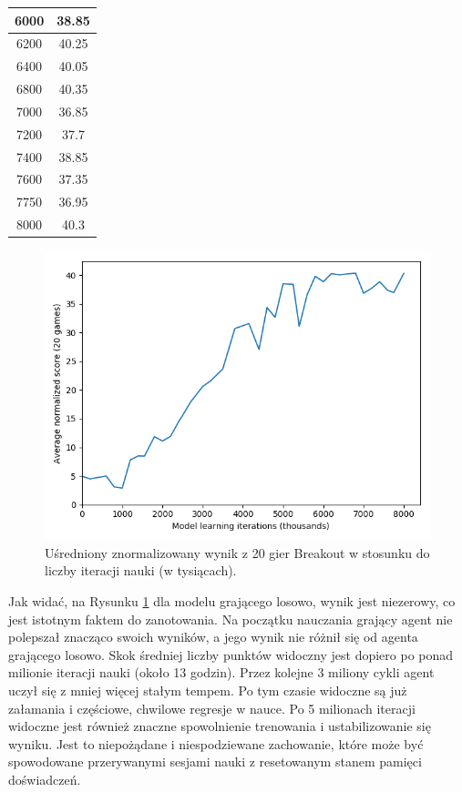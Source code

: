 \documentclass[12pt]{article}
\begin{document}
\begin{center}
\begin{table}[H]
\begin{tabular}{|c|c|}
\hline
6000  &  38.85 \\
\hline
6200  &  40.25 \\
\hline
6400  &  40.05 \\
\hline
6800  &  40.35 \\
\hline
7000  &  36.85 \\
\hline
7200  &  37.7 \\
\hline
7400  &  38.85 \\
\hline
7600  &  37.35 \\
\hline
7750  &  36.95 \\
\hline
8000  &  40.3 \\
\hline
\end{tabular}
\end{table}
\end{center}

\begin{figure}[H]
\centering \includegraphics[scale=0.7]{20games.png}
\caption{Uśredniony znormalizowany wynik z 20 gier Breakout w stosunku do liczby iteracji nauki (w tysiącach).}
\label{results}
\end{figure}


 Jak widać, na Rysunku \ref{results} dla modelu grającego losowo, wynik jest niezerowy, co jest istotnym faktem do zanotowania. Na początku nauczania grający agent nie polepszał znacząco swoich wyników, a jego wynik nie różnił się od agenta grającego losowo. Skok średniej liczby punktów widoczny jest dopiero po ponad milionie iteracji nauki (około 13 godzin). Przez kolejne 3 miliony cykli agent uczył się z mniej więcej stałym tempem. Po tym czasie widoczne są już załamania i częściowe, chwilowe regresje w nauce. Po 5 milionach iteracji widoczne jest również znaczne spowolnienie trenowania i ustabilizowanie się wyniku. Jest to niepożądane i niespodziewane zachowanie, które może być spowodowane przerywanymi sesjami nauki z resetowanym stanem pamięci doświadczeń.
\end{document}
